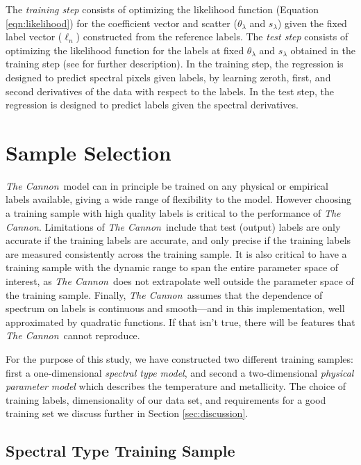 \documentclass[twocolumn]{aastex62}
\newcommand{\thecannon}{\textsl{The Cannon}}
\begin{document}
The \emph{training step} consists of optimizing the likelihood function (Equation \ref{eqn:likelihood}) for the coefficient vector and scatter ($\theta_{\lambda}$ and $s_{\lambda}$) given the fixed label vector (\emph{$\ell_n$}) constructed from the reference labels. The \emph{test step} consists of optimizing the likelihood function for the labels at fixed $\theta_{\lambda}$ and $s_{\lambda}$ obtained in the training step (see \citealt{Ness:2015} for further description). 
In the training step, the regression is designed to predict spectral pixels
given labels, by learning zeroth, first, and second derivatives of the data with respect to
the labels. In the test step, the regression is designed to predict labels given the spectral
derivatives. 
 

\section{Sample Selection} \label{sec:sample_selection}

\thecannon\ model can in principle be trained on any physical or empirical labels available, giving a wide range of flexibility to the model. However choosing a training sample with high quality labels is critical to the performance of \thecannon.
Limitations of \thecannon\ include that test (output) labels are only accurate if the training labels are accurate, and only precise if the training labels are measured consistently across the training sample.
It is also critical to have a training sample with the dynamic range to span the entire parameter space of interest, as \thecannon\ does not extrapolate well outside the parameter space of the training sample.
Finally, \thecannon\ assumes that the dependence of spectrum on labels is continuous and smooth---and in this implementation, well approximated by quadratic functions. If that isn't true, there will be features that \thecannon\ cannot reproduce.

For the purpose of this study, we have constructed two different training samples: first a one-dimensional \emph{spectral type model}, and second a two-dimensional \emph{physical parameter model} which describes the temperature and metallicity. The choice of training labels, dimensionality of our data set, and requirements for a good training set we discuss further in Section \ref{sec:discussion}.

\subsection{Spectral Type Training Sample}
\end{document}
